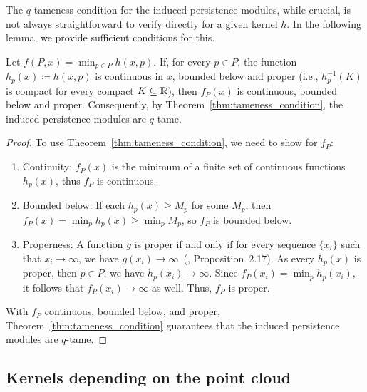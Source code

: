 The $q$-tameness condition for the induced persistence modules, while crucial,
is not always straightforward to verify directly for a given kernel $h$. In the
following lemma, we provide sufficient conditions for this.
\begin{lemma}
    \label{lem:tameness_kernels}
    Let $f(P, x) = \min_{p \in P} h(x, p)$. If, for every $p \in P$,
    the function $h_p(x) \coloneqq h(x, p)$ is continuous in $x$,
    bounded below and proper (i.e., $h_p^{-1}(K)$ is compact for every compact
    $K \subseteq \mathbb{R}$), then $f_P(x)$ is continuous, bounded below and proper.
    Consequently, by Theorem~\ref{thm:tameness_condition}, the induced
    persistence modules are $q$-tame.
\end{lemma}
\begin{proof}
    To use Theorem~\ref{thm:tameness_condition}, we need to show for $f_P$:
    \begin{enumerate}
        \item Continuity: $f_P(x)$ is the minimum of a finite set of continuous
            functions $h_p(x)$, thus $f_P$ is continuous.
        \item Bounded below: If each $h_p(x) \geq M_p$ for some $M_p$,
            then $f_P(x) = \min_p h_p(x) \geq \min_p M_p$, so $f_P$ is bounded
            below.
        \item Properness: A function $g$ is proper if and only if for every
            sequence $\{x_i\}$ such that $x_i \to \infty$, we have
            $g(x_i) \to \infty$~(\cite{lee2003smooth}, Proposition~2.17).
            As every $h_p(x)$ is proper, then $p\in P$, we have
            $h_p(x_i) \to \infty$. Since $f_P(x_i) = \min_p h_p(x_i)$, it follows
            that $f_P(x_i) \to \infty$ as well. Thus, $f_P$ is proper.
    \end{enumerate}
    With $f_P$ continuous, bounded below, and proper,
    Theorem~\ref{thm:tameness_condition} guarantees that the induced persistence
    modules are $q$-tame.
\end{proof}

\subsection{Kernels depending on the point cloud}

